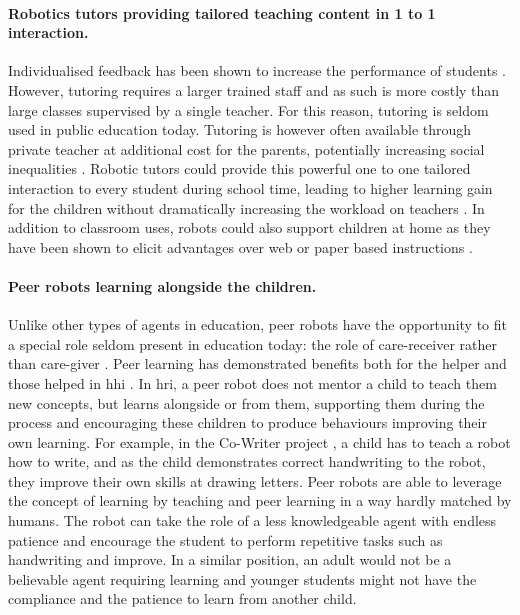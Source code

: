 	\paragraph{Robotics tutors providing tailored teaching content in 1 to 1 interaction.} 
	Individualised feedback has been shown to increase the performance of students \citep{cohen1982educational,bloom19842}. However, tutoring requires a larger trained staff and as such is more costly than large classes supervised by a single teacher. For this reason, tutoring is seldom used in public education today. Tutoring is however often available through private teacher at additional cost for the parents, potentially increasing social inequalities \citep{bray2009confronting}. Robotic tutors could provide this powerful one to one tailored interaction to every student during school time, leading to higher learning gain for the children without dramatically increasing the workload on teachers  \citep{kanda2004interactive,leyzberg2012physical,kennedy2016social,gordon2016affective}. In addition to classroom uses, robots could also support children at home as they have been shown to elicit advantages over web or paper based instructions \citep{han2005educational}. 
	
	\paragraph{Peer robots learning alongside the children.}
	Unlike other types of agents in education, peer robots have the opportunity to fit a special role seldom present in education today: the role of care-receiver rather than care-giver \citep{tanaka2012children}. Peer learning has demonstrated benefits both for the helper and those helped in \gls{hhi} \citep{topping2005trends}. In \gls{hri}, a peer robot does not mentor a child to teach them new concepts, but learns alongside or from them, supporting them during the process and encouraging these children to produce behaviours improving their own learning. For example, in the Co-Writer project \citep{hood2015children}, a child has to teach a robot how to write, and as the child demonstrates correct handwriting to the robot, they improve their own skills at drawing letters. Peer robots are able to leverage the concept of learning by teaching \citep{frager1970learning} and peer learning \citep{topping2005trends} in a way hardly matched by humans. The robot can take the role of a less knowledgeable agent with endless patience and encourage the student to perform repetitive tasks such as handwriting and improve. In a similar position, an adult would not be a believable agent requiring learning and younger students might not have the compliance and the patience to learn from another child.
	
